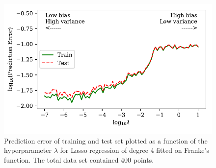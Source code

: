 \documentclass[a4paper, 10pt]{article}
\begin{document}
\begin{figure}
    \includegraphics{figs/biasvariancetradeoff_LASSO_Franke.pdf}
    \caption{Prediction error of training and test set plotted as a function of the hyperparameter $\lambda$ for Lasso regression of degree 4 fitted on Franke's function. The total data set contained 400 points.}
    \label{fig:bias_lasso_Franke}
\end{figure}
\end{document}

